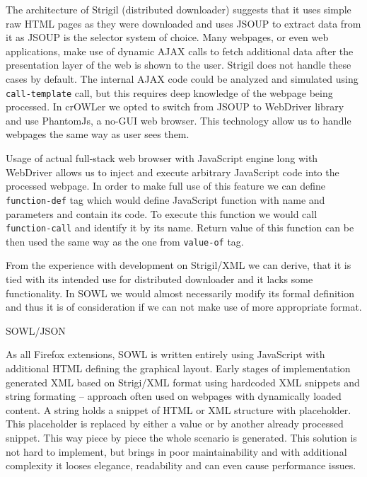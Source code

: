 The architecture of Strigil (distributed downloader) suggests that it uses
simple raw HTML pages as they were downloaded and uses JSOUP to extract data
from it as JSOUP is the selector system of choice. Many webpages, or even web
applications, make use of dynamic AJAX calls to fetch additional data after the
presentation layer of the web is shown to the user. Strigil does not handle
these cases by default. The internal AJAX code could be analyzed and simulated
using {\tt call-template} call, but this requires deep knowledge of the webpage
being processed. In crOWLer we opted to switch from JSOUP to WebDriver library
and use PhantomJs, a no-GUI web browser. This technology allow us to handle
webpages the same way as user sees them. 

Usage of actual full-stack web browser with JavaScript engine long with
WebDriver allows us to inject and execute arbitrary JavaScript code into the
processed webpage. In order to make full use of this feature we can define {\tt
function-def} tag which would define JavaScript function with name and
parameters and contain its code. To execute this function we would call {\tt
function-call} and identify it by its name. Return value of this function can
be then used the same way as the one from {\tt value-of} tag. 

From the experience with development on Strigil/XML we can derive, that it is
tied with its intended use for distributed downloader and it lacks some
functionality. In SOWL we would almost necessarily modify its formal definition
and thus it is of consideration if we can not make use of more appropriate
format. 


\secc SOWL/JSON

As all Firefox extensions, SOWL is written entirely using JavaScript with
additional HTML defining the graphical layout. Early stages of implementation
generated XML based on Strigi/XML format using hardcoded XML snippets and
string formating -- approach often used on webpages with dynamically loaded
content. A string holds a snippet of HTML or XML structure with placeholder.
This placeholder is replaced by either a value or by another already processed
snippet. This way piece by piece the whole scenario is generated. This solution
is not hard to implement, but brings in poor maintainability and with additional
complexity it looses elegance, readability and can even cause performance
issues. 

